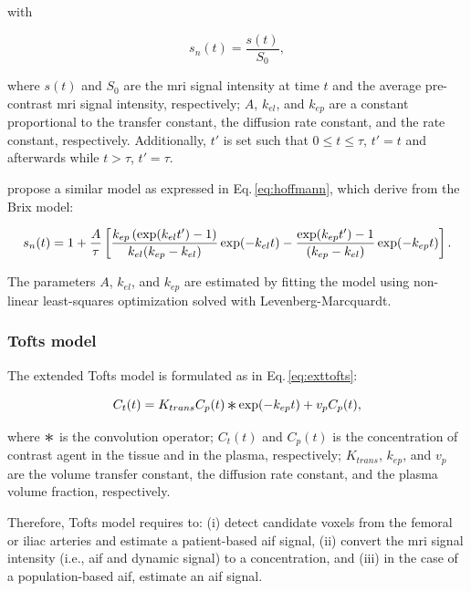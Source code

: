 \noindent with

\begin{equation}
  s_n(t) = \frac{s(t)}{S_0},
  \label{eq:enh}
\end{equation}

\noindent where $s(t)$ and $S_0$ are the \ac{mri} signal intensity at time $t$ and the average pre-contrast \ac{mri} signal intensity, respectively; $A$, $k_{el}$, and $k_{ep}$ are a constant proportional to the transfer constant, the diffusion rate constant, and the rate constant, respectively.
Additionally, $t'$ is set such that $0 \leq t \leq \tau$, $t' = t$ and afterwards while $t > \tau$, $t' = \tau$.

\citeauthor{hoffmann1995pharmacokinetic} propose a similar model as expressed in Eq.\,\eqref{eq:hoffmann}, which derive from the Brix model:

\begin{equation}
  \small
  s_n(t) = 1 + \frac{A}{\tau} \left[ \frac{k_{ep} \left( \exp(k_{el} t') - 1 \right)}{k_{el}(k_{ep} - k_{el})} \exp(- k_{el} t) - \frac{\exp(k_{ep} t') - 1}{(k_{ep} - k_{el})} \exp(- k_{ep} t) \right].
  \label{eq:hoffmann}
\end{equation}

The parameters $A$, $k_{el}$, and $k_{ep}$ are estimated by fitting the model using non-linear least-squares optimization solved with Levenberg-Marcquardt.

\subsubsection{Tofts model}\label{sec:tofts}

The extended Tofts model is formulated as in Eq.\,\eqref{eq:exttofts}:

\begin{equation}
  C_t(t) = K_{trans} C_p(t) \Conv \exp(-k_{ep}t) + v_p C_p(t),
  \label{eq:exttofts}
\end{equation}

\noindent where $\Conv$ is the convolution operator; $C_t(t)$ and $C_p(t)$ is the concentration of contrast agent in the tissue and in the plasma, respectively; $K_{trans}$, $k_{ep}$, and $v_p$ are the volume transfer constant, the diffusion rate constant, and the plasma volume fraction, respectively.

Therefore, Tofts model requires to:
(i) detect candidate voxels from the femoral or iliac arteries and estimate a patient-based \ac{aif} signal,
(ii) convert the \ac{mri} signal intensity (i.e., \ac{aif} and dynamic signal) to a concentration, and
(iii) in the case of a population-based \ac{aif}, estimate an \ac{aif} signal.


